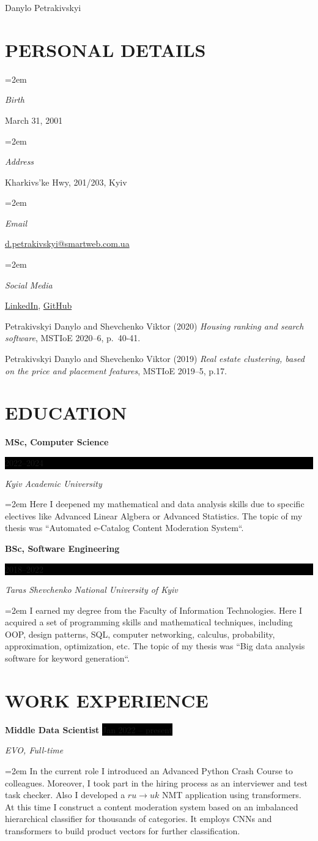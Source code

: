 \documentclass[paper=a4,fontsize=11pt]{scrartcl}
\newcommand{\sepspace}{\vspace*{1em}}
\newcommand{\MyName}[1]{
    \Huge \usefont{OT1}{phv}{b}{n} \hfill #1
    \par \normalsize \normalfont}
\newcommand{\NewPart}[1]{\section*{\uppercase{#1}}}
\newcommand{\PersonalEntry}[2]{
    \noindent\hangindent=2em\hangafter=0
    \parbox{6em}{\textit{#1}}
    \hspace{1.5em} #2 \par}
\newcommand{\EducationEntry}[4]{
    \noindent \textbf{#1} \hfill
    \colorbox{Black}{\parbox{6em}{\hfill\color{White}#2}} \par
    \noindent \textit{#3} \par
    \noindent\hangindent=2em\hangafter=0 \small #4
    \normalsize \par}
\newcommand{\WorkEntry}[4]{
    \noindent \textbf{#1} \hfill
    \colorbox{Black}{\color{White}#2} \par
    \noindent \textit{#3} \par
    \noindent\hangindent=2em\hangafter=0 \small #4
    \normalsize \par}
\begin{document}
    \MyName{Danylo Petrakivskyi}

    \sepspace

    \NewPart{Personal details}{}

    \PersonalEntry{Birth}{March 31, 2001}
    \PersonalEntry{Address}{Kharkivs'ke Hwy, 201/203, Kyiv}
    \PersonalEntry{Email}{\url{d.petrakivskyi@smartweb.com.ua}}
    \PersonalEntry{Social Media}{\href{https://www.linkedin.com/in/danylo-petrakivskyi-916665174/}{LinkedIn},
        \href{https://github.com/xXxRisingTidexXx/}{GitHub}}

    \begin{thebibliography}{9}
        Petrakivskyi Danylo and Shevchenko Viktor (2020) \emph{Housing ranking and search software}, MSTIoE 2020--6,
        p.~40-41.

        Petrakivskyi Danylo and Shevchenko Viktor (2019) \emph{Real estate clustering, based on the price and placement
        features}, MSTIoE 2019--5, p.17.
    \end{thebibliography}

    \NewPart{Education}{}

    \EducationEntry{MSc, Computer Science}{2022--2024}{Kyiv Academic University}{Here I deepened my mathematical and
    data analysis skills due to specific electives like Advanced Linear Algbera or Advanced Statistics. The topic of
    my thesis was ``Automated e-Catalog Content Moderation System``.}
    \sepspace

    \EducationEntry{BSc, Software Engineering}{2018--2022}{Taras Shevchenko National University of Kyiv}{I earned my
    degree from the Faculty of Information Technologies. Here I acquired a set of programming skills and mathematical
    techniques, including OOP, design patterns, SQL, computer networking, calculus, probability, approximation,
        optimization, etc. The topic of my thesis was ``Big data analysis software for keyword generation``.}

    \NewPart{Work experience}{}

    \WorkEntry{Middle Data Scientist}{Jan 2022 -- present}{EVO, Full-time}{In the current role I introduced an Advanced
    Python Crash Course to colleagues. Moreover, I took part in the hiring process as an interviewer and test task
    checker. Also I developed a $ru \rightarrow uk$ NMT application using transformers. At this time I construct a
    content moderation system based on an imbalanced hierarchical classifier for thousands of categories. It employs
    CNNs and transformers to build product vectors for further classification.}
\end{document}
